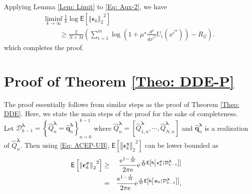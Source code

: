 \documentclass[10pt,twocolumn,twoside]{IEEEtran}
\begin{document}
Applying Lemma \ref{Lem: Limit} to \eqref{Eq: Aux-2}, we have
\begin{align}
&\liminf_{k\rightarrow\infty}\frac{1}{k}\log{\ensuremath{\mathsf{E}\left[{{\left\Vert{{\ensuremath{\boldsymbol{{\epsilon}}}}_k}\right\Vert_{{2}}}^2} \right]}}\nonumber\\
&\hspace{1cm}\geq\frac{2}{N+M}{\left({\sum_{i=1}^m\log{\left({1+\mu^\star \frac{d^2}{d {x^i}^2}U_i{\left({{x^i}^\star}\right)}}\right)}-R_{\mathcal{Q}}}\right)}.
\end{align}
which completes the proof.
\section{Proof of Theorem \ref{Theo: DDE-P}}\label{App: DDE-P}
The proof essentially follows from similar steps as the proof of Theorem \ref{Theo: DDE}. Here, we state the main steps of the proof for the sake of completeness. Let $\mathcal{D}^{{\ensuremath{\boldsymbol{{\lambda}}}}}_{k-1}=\left\{\hat{Q}^{{\ensuremath{\boldsymbol{{\lambda}}}}}_{n}={\ensuremath{\boldsymbol{{\hat{q}}}}}^{{\ensuremath{\boldsymbol{{\lambda}}}}}_n\right\}_{n=0}^{k-1}$ where  $\hat{Q}^{{\ensuremath{\boldsymbol{{\lambda}}}}}_n=\left[\hat{Q}^{{\ensuremath{\boldsymbol{{\lambda}}}}}_{1,n},\cdots,\hat{Q}^{{\ensuremath{\boldsymbol{{\lambda}}}}}_{N,n}\right]$ and  ${\ensuremath{\boldsymbol{{\hat{q}}}}}^{{\ensuremath{\boldsymbol{{\lambda}}}}}_n$ is a realization of $\hat{Q}^{{\ensuremath{\boldsymbol{{\lambda}}}}}_n$. Then using \eqref{Eq: ACEP-UB}, ${\ensuremath{\mathsf{E}\left[{{\left\Vert{{\ensuremath{\boldsymbol{{\epsilon}}}}_k^{{\ensuremath{\boldsymbol{{x}}}}}}\right\Vert_{{2}}}^2} \right]}}$ can be lower bounded as
\begin{eqnarray}\label{Eq: MDPLB}
{\ensuremath{\mathsf{E}\left[{{\left\Vert{{\ensuremath{\boldsymbol{{\epsilon}}}}_k^{{\ensuremath{\boldsymbol{{x}}}}}}\right\Vert_{{2}}}^2} \right]}}&\geq &\frac{{\ensuremath{{\rm e}^{{1-\frac{1}{M}}}}}}{{2\pi {\ensuremath{{\rm e}^{{}}}}}}{\ensuremath{{\rm e}^{{\frac{2}{M}{\ensuremath{\mathsf{E}\left[{{\ensuremath{\mathsf{h}\left[\left.{{\ensuremath{\boldsymbol{{\epsilon}}}}_k^{{\ensuremath{\boldsymbol{{x}}}}}}\right|{\mathcal{D}^{{\ensuremath{\boldsymbol{{\lambda}}}}}_{k-1}}\right]}}} \right]}}}}}}\nonumber\\
&=&\frac{{\ensuremath{{\rm e}^{{1-\frac{1}{M}}}}}}{{2\pi {\ensuremath{{\rm e}^{{}}}}}}{\ensuremath{{\rm e}^{{\frac{2}{M}{\ensuremath{\mathsf{E}\left[{{\ensuremath{\mathsf{h}\left[\left.{{\ensuremath{\boldsymbol{{x}}}}_k}\right|{\mathcal{D}^{{\ensuremath{\boldsymbol{{\lambda}}}}}_{k-1}}\right]}}} \right]}}}}}},
\end{eqnarray}
\end{document}
